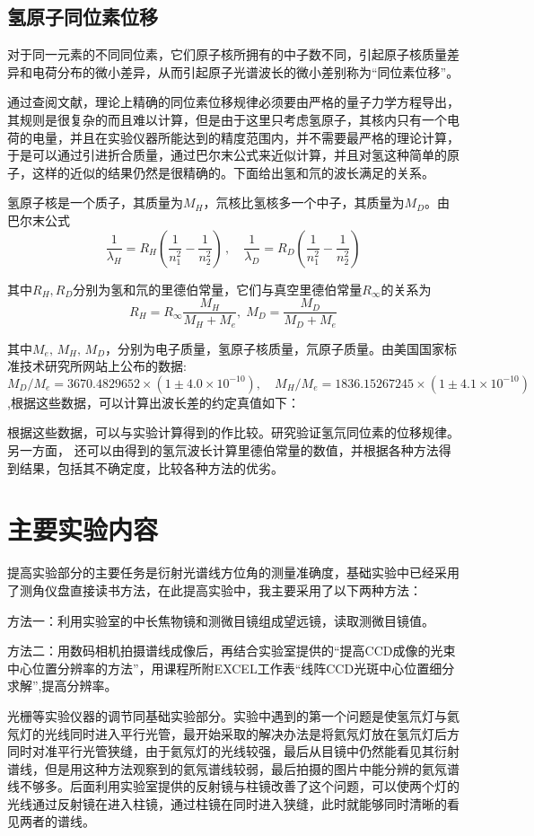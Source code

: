 \documentclass[8pt,a4paper,nocap]{ctexart}
\begin{document}
\subsection{氢原子同位素位移}
对于同一元素的不同同位素，它们原子核所拥有的中子数不同，引起原子核质量差异和电荷分布的微小差异，从而引起原子光谱波长的微小差别称为“同位素位移”。

通过查阅文献，理论上精确的同位素位移规律必须要由严格的量子力学方程导出，其规则是很复杂的而且难以计算，但是由于这里只考虑氢原子，其核内只有一个电荷的电量，并且在实验仪器所能达到的精度范围内，并不需要最严格的理论计算，于是可以通过引进折合质量，通过巴尔末公式来近似计算，并且对氢这种简单的原子，这样的近似的结果仍然是很精确的。下面给出氢和氘的波长满足的关系。

氢原子核是一个质子，其质量为\(M_H\)，氘核比氢核多一个中子，其质量为\(M_D\)。由巴尔末公式
\[\frac{1}{\lambda_H} = R_H(\frac{1}{n_1^2} - \frac{1}{n_2^2}) \, ,\quad \frac{1}{\lambda_D} = R_D(\frac{1}{n_1^2} - \frac{1}{n_2^2})\]

其中\(R_H,R_D\)分别为氢和氘的里德伯常量，它们与真空里德伯常量\(R_\infty\)的关系为
\[\displaystyle R_H = R_\infty\frac{M_H}{M_H + M_e},\;M_D = \frac{M_D}{M_D + M_e}\]

其中\(M_e,\, M_H,\,M_D\)，分别为电子质量，氢原子核质量，氘原子质量。由美国国家标准技术研究所网站上公布的数据:\(M_D/M_e = 3670.4829652\times(1 \pm 4.0\times10^{-10}),\quad M_H/M_e = 1836.15267245\times(1 \pm 4.1\times10^{-10})\),根据这些数据，可以计算出波长差的约定真值如下：

根据这些数据，可以与实验计算得到的作比较。研究验证氢氘同位素的位移规律。另一方面， 还可以由得到的氢氘波长计算里德伯常量的数值，并根据各种方法得到结果，包括其不确定度，比较各种方法的优劣。
\section{主要实验内容}
提高实验部分的主要任务是衍射光谱线方位角的测量准确度，基础实验中已经采用了测角仪盘直接读书方法，在此提高实验中，我主要采用了以下两种方法：

方法一：利用实验室的中长焦物镜和测微目镜组成望远镜，读取测微目镜值。

方法二：用数码相机拍摄谱线成像后，再结合实验室提供的“提高CCD成像的光束中心位置分辨率的方法”，用课程所附EXCEL工作表“线阵CCD光斑中心位置细分求解”,提高分辨率。

光栅等实验仪器的调节同基础实验部分。实验中遇到的第一个问题是使氢氘灯与氦氖灯的光线同时进入平行光管，最开始采取的解决办法是将氦氖灯放在氢氘灯后方同时对准平行光管狭缝，由于氦氖灯的光线较强，最后从目镜中仍然能看见其衍射谱线，但是用这种方法观察到的氦氖谱线较弱，最后拍摄的图片中能分辨的氦氖谱线不够多。后面利用实验室提供的反射镜与柱镜改善了这个问题，可以使两个灯的光线通过反射镜在进入柱镜，通过柱镜在同时进入狭缝，此时就能够同时清晰的看见两者的谱线。
\end{document}
